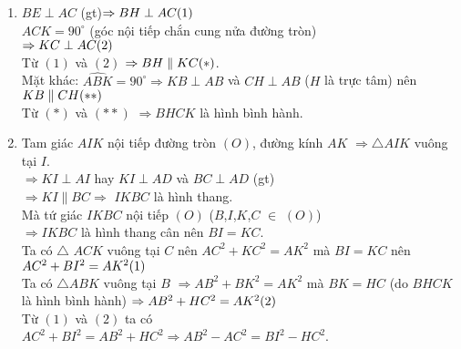 \begin{ex}
{\begin{enumerate}
		\\ $\widehat{C}$ góc chung;
		\\ Nên $\triangle ADC \backsim \triangle BEC$
		$\Rightarrow  \dfrac{AD}{BE}=\dfrac{DC}{EC} \Leftrightarrow AD\cdot EC=BE \cdot DC.$
		\item  $BE\perp AC$ (gt)$\Rightarrow BH\perp AC \hfill (1)$ \\ $\widehat{ACK}=90^{\circ}$ (góc nội tiếp chắn cung nửa đường tròn)
		\\ $\Rightarrow KC\perp AC \hfill (2)$
		\\Từ $(1)$ và $(2)$ $\Rightarrow BH \parallel KC \hfill (*)$.
		\\ Mặt khác: $\widehat{ABK}=90^{\circ}\Rightarrow KB \perp AB$ và $CH \perp AB$ ($H$ là trực tâm) nên $KB \parallel CH \hfill (**)$
		\\ Từ $(*)$ và $(**)$ $\Rightarrow BHCK$ là hình bình hành.
		\item Tam giác $AIK$ nội tiếp đường tròn $(O)$, đường kính $AK$ $\Rightarrow \triangle AIK$ vuông tại $I$.
		\\ $\Rightarrow KI \perp AI$ hay $KI \perp AD$ và $BC \perp AD$ (gt)
		\\ $\Rightarrow KI \parallel BC \Rightarrow$ $IKBC$ là hình thang.
		\\ Mà tứ giác $IKBC$ nội tiếp $(O)$ ($B$,$I$,$K$,$C$ $\in$ $(O)$)
		\\ $\Rightarrow IKBC$ là hình thang cân nên $BI=KC$.
		\\ Ta có $\triangle$ $ACK$ vuông tại $C$ nên $AC^2+KC^2=AK^2$ mà $BI=KC$ nên $AC^2 + BI^2 = AK^2\hfill (1)$
		\\ Ta có $\triangle ABK$ vuông tại $B$ $\Rightarrow AB^2 + BK^2 = AK^2$ mà $BK=HC$ (do $BHCK$ là hình bình hành) $\Rightarrow AB^2 + HC^2 = AK^2 \hfill (2)$
		\\ Từ $(1)$ và $(2)$ ta có $AC^2 +BI^2 = AB^2 + HC^2 \Rightarrow AB^2 - AC^2 = BI^2 - HC^2$.
	\end{enumerate}
}
	\end{ex}

